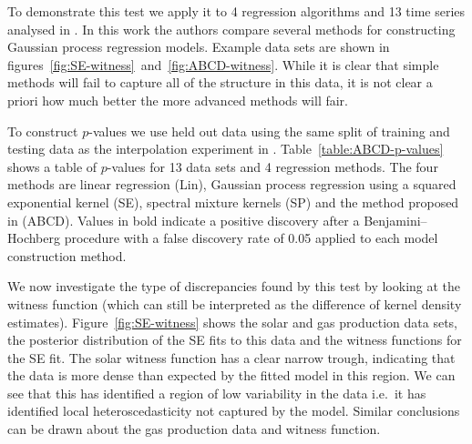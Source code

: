 \documentclass{article} %
\def\ie{i.e.\ }
\begin{document}
To demonstrate this test we apply it to 4 regression algorithms and 13 time series analysed in \cite{Lloyd2014-nz}.
In this work the authors compare several methods for constructing Gaussian process \citep[e.g.][]{Rasmussen2006-ml} regression models.
Example data sets are shown in figures~\ref{fig:SE-witness}~and~\ref{fig:ABCD-witness}.
While it is clear that simple methods will fail to capture all of the structure in this data, it is not clear a priori how much better the more advanced methods will fair.

To construct $p$-values we use held out data using the same split of training and testing data as the interpolation experiment in \cite{Lloyd2014-nz}\footnotemark.
Table~\ref{table:ABCD-p-values} shows a table of $p$-values for 13 data sets and 4 regression methods.
The four methods are linear regression (Lin), Gaussian process regression using a squared exponential kernel (SE), spectral mixture kernels \citep{Wilson2013-eq} (SP) and the method proposed in \cite{Lloyd2014-nz} (ABCD).
Values in  bold indicate a positive discovery after a Benjamini--Hochberg \citep{Benjamini_undated-mh} procedure with a false discovery rate of 0.05 applied to each model construction method.

We now investigate the type of discrepancies found by this test by looking at the witness function (which can still be interpreted as the difference of kernel density estimates).
Figure~\ref{fig:SE-witness} shows the solar and gas production data sets, the posterior distribution of the SE fits to this data and the witness functions for the SE fit.
The solar witness function has a clear narrow trough, indicating that the data is more dense than expected by the fitted model in this region.
We can see that this has identified a region of low variability in the data \ie it has identified local heteroscedasticity not captured by the model.
Similar conclusions can be drawn about the gas production data and witness function.
\end{document}
